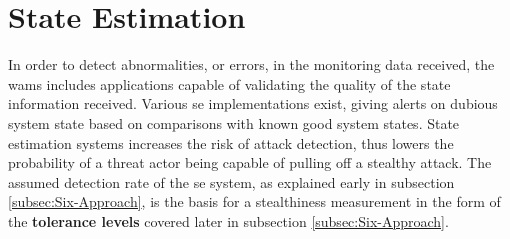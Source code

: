\section{State Estimation} \label{sec:3-SE}


In order to detect abnormalities, or errors, in the monitoring data received, the \acrshort{wams} includes applications capable of validating the quality of the state information received. Various \acrfull{se} implementations exist, giving alerts on dubious system state based on comparisons with known good system states. State estimation systems increases the risk of attack detection, thus lowers the probability of a threat actor being capable of pulling off a stealthy attack. The assumed detection rate of the \acrshort{se} system, as explained early in subsection \ref{subsec:Six-Approach}, is the basis for a stealthiness measurement in the form of the \textbf{tolerance levels} covered later in subsection \ref{subsec:Six-Approach}.


